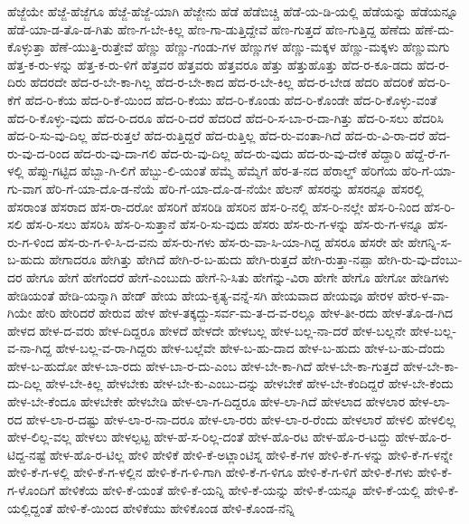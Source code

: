{ಹೆಜ್ಜೆಯೇ
ಹೆಜ್ಜೆ-ಹೆಜ್ಜೆಗೂ
ಹೆಜ್ಜೆ-ಹೆಜ್ಜೆ-ಯಾಗಿ
ಹೆಜ್ಜೇನು
ಹೆಡೆ
ಹೆಡೆಬಿಚ್ಚಿ
ಹೆಡೆ-ಯ-ಡಿ-ಯಲ್ಲಿ
ಹೆಡೆಯನ್ನು
ಹೆಡೆಯನ್ನೂ
ಹೆಡೆ-ಯಾ-ಡ-ತೊ-ಡ-ಗಿತು
ಹೆಣ-ಗ-ಬೇ-ಕಿಲ್ಲ
ಹೆಣ-ಗಾ-ಡುತ್ತಿದ್ದೇವೆ
ಹೆಣ-ಗುತ್ತದೆ
ಹೆಣ-ಗುತ್ತಿದ್ದ
ಹೆಣೆದು
ಹೆಣೆ-ದು-ಕೊಳ್ಳುತ್ತಾ
ಹೆಣೆ-ಯುತ್ತಿ-ರುತ್ತೇವೆ
ಹೆಣ್ಣು
ಹೆಣ್ಣು-ಗಂಡು-ಗಳ
ಹೆಣ್ಣುಗಳ
ಹೆಣ್ಣು-ಮಕ್ಕಳ
ಹೆಣ್ಣು-ಮಕ್ಕಳು
ಹೆಣ್ಣುಮಗು
ಹೆತ್ತ-ಕ-ರು-ಳನ್ನು
ಹೆತ್ತ-ಕ-ರು-ಳಿಗೆ
ಹೆತ್ತವರ
ಹೆತ್ತವರು
ಹೆತ್ತವರೂ
ಹೆತ್ತು
ಹೆತ್ತುಹೊತ್ತು
ಹೆದ-ರ-ಕೂ-ಡದು
ಹೆದ-ರ-ದಿರು
ಹೆದರದೇ
ಹೆದ-ರ-ಬೇ-ಕಾ-ಗಿಲ್ಲ
ಹೆದ-ರ-ಬೇ-ಕಾದ
ಹೆದ-ರ-ಬೇ-ಕಿಲ್ಲ
ಹೆದ-ರ-ಬೇಡ
ಹೆದರಿ
ಹೆದರಿಕೆ
ಹೆದ-ರಿ-ಕೆಗೆ
ಹೆದ-ರಿ-ಕೆಯ
ಹೆದ-ರಿ-ಕೆ-ಯಿಂದ
ಹೆದ-ರಿ-ಕೆಯು
ಹೆದ-ರಿ-ಕೊಂಡು
ಹೆದ-ರಿ-ಕೊಂಡೇ
ಹೆದ-ರಿ-ಕೊಳ್ಳು-ವಂತೆ
ಹೆದ-ರಿ-ಕೊಳ್ಳು-ವುದು
ಹೆದ-ರಿ-ದರೂ
ಹೆದ-ರಿ-ದರೆ
ಹೆದರಿದೆ
ಹೆದ-ರಿ-ಸ-ಬಾ-ರ-ದಾ-ಗಿತ್ತು
ಹೆದ-ರಿ-ಸಲು
ಹೆದರಿಸಿ
ಹೆದ-ರಿ-ಸು-ವು-ದಿಲ್ಲ
ಹೆದ-ರುತ್ತಲೆ
ಹೆದ-ರುತ್ತಿದ್ದರೆ
ಹೆದ-ರುತ್ತಿಲ್ಲ
ಹೆದ-ರು-ವಂತಾ-ಗಿದೆ
ಹೆದ-ರು-ವಿ-ರಾ-ದರೆ
ಹೆದ-ರು-ವು-ದ-ರಿಂದ
ಹೆದ-ರು-ವು-ದಾ-ಗಲಿ
ಹೆದ-ರು-ವು-ದಿಲ್ಲ
ಹೆದ-ರು-ವುದು
ಹೆದ-ರು-ವು-ದೇಕೆ
ಹೆದ್ದಾರಿ
ಹೆದ್ದೆ-ರೆ-ಗ-ಳಲ್ಲಿ
ಹೆಪ್ಪು-ಗಟ್ಟಿದ
ಹೆಬ್ಬಾ-ಗಿ-ಲಿಗೆ
ಹೆಬ್ಬು-ಲಿ-ಯಂತೆ
ಹೆಮ್ಮೆ
ಹೆಮ್ಮೆಗೆ
ಹೆರ-ತ-ನದ
ಹೆರಾಲ್ಡ್
ಹೆರಿಗೆಯ
ಹೆರಿ-ಗೆ-ಯಾ-ಗು-ವಾಗ
ಹೆರಿ-ಗೆ-ಯಾ-ದೊ-ಡ-ನೆಯೆ
ಹೆರಿ-ಗೆ-ಯಾ-ದೊ-ಡ-ನೆಯೇ
ಹೆಲನ್
ಹೆಸರನ್ನು
ಹೆಸರನ್ನೂ
ಹೆಸರಲ್ಲಿ
ಹೆಸರಾಂತ
ಹೆಸರಾದ
ಹೆಸ-ರಾ-ದರೋ
ಹೆಸರಿಗೆ
ಹೆಸರಿಡಿ
ಹೆಸರಿನ
ಹೆಸ-ರಿ-ನಲ್ಲಿ
ಹೆಸ-ರಿ-ನಲ್ಲೇ
ಹೆಸ-ರಿ-ನಿಂದ
ಹೆಸ-ರಿ-ಸಲಿ
ಹೆಸ-ರಿ-ಸಲು
ಹೆಸರಿಸಿ
ಹೆಸ-ರಿ-ಸುತ್ತಾನೆ
ಹೆಸ-ರಿ-ಸು-ವುದು
ಹೆಸರು
ಹೆಸ-ರು-ಗ-ಳನ್ನು
ಹೆಸ-ರು-ಗ-ಳನ್ನೂ
ಹೆಸ-ರು-ಗ-ಳಿಂದ
ಹೆಸ-ರು-ಗ-ಳಿ-ಸಿ-ದ-ವನು
ಹೆಸ-ರು-ಗಳು
ಹೆಸ-ರು-ವಾ-ಸಿ-ಯಾ-ಗಿದ್ದ
ಹೆಸರೂ
ಹೆಸರೇ
ಹೇ
ಹೇಗನ್ನಿ-ಸ-ಬ-ಹುದು
ಹೇಗಾದರೂ
ಹೇಗಿತ್ತು
ಹೇಗಿದೆ
ಹೇಗಿ-ರ-ಬ-ಹುದು
ಹೇಗಿ-ರುತ್ತದೆ
ಹೇಗಿ-ರುತ್ತಾ-ನಪ್ಪಾ
ಹೇಗಿ-ರು-ವು-ದೆಂಬು-ದರ
ಹೇಗೂ
ಹೇಗೆ
ಹೇಗೆಂದರೆ
ಹೇಗೆ-ಎಂಬುದು
ಹೇಗೆ-ನಿ-ಸಿತು
ಹೇಗೆನ್ನು-ವಿರಾ
ಹೇಗೇ
ಹೇಗೊ
ಹೇಗೋ
ಹೇಡಿಗಳು
ಹೇಡಿಯಂತೆ
ಹೇಡಿ-ಯನ್ನಾಗಿ
ಹೇಡ್
ಹೇಯ
ಹೇಯ-ಕೃತ್ಯ-ವನ್ನೆ-ಸಗಿ
ಹೇಯವಾದ
ಹೇಯವೂ
ಹೇರಳ
ಹೇರ-ಳ-ವಾ-ಗಿಯೇ
ಹೇರಿ
ಹೇರಿದರೆ
ಹೇರುವ
ಹೇಳ
ಹೇಳ-ತಕ್ಕದ್ದು-ಸರ್ವ-ಮ-ತ-ದ-ವ-ರಲ್ಲೂ
ಹೇಳ-ತೀ-ರದು
ಹೇಳ-ತೊ-ಡ-ಗಿದ
ಹೇಳದ
ಹೇಳ-ದ-ವರು
ಹೇಳ-ದಿದ್ದರೂ
ಹೇಳದೆ
ಹೇಳದೇ
ಹೇಳಬಲ್ಲ
ಹೇಳ-ಬಲ್ಲ-ನಾ-ದರೆ
ಹೇಳ-ಬಲ್ಲನೇ
ಹೇಳ-ಬಲ್ಲ-ವ-ನಾ-ಗಿದ್ದ
ಹೇಳ-ಬಲ್ಲ-ವ-ರಾ-ಗಿದ್ದರು
ಹೇಳ-ಬಲ್ಲೆವೇ
ಹೇಳ-ಬ-ಹು-ದಾದ
ಹೇಳ-ಬ-ಹುದು
ಹೇಳ-ಬ-ಹು-ದೆಂದು
ಹೇಳ-ಬ-ಹುದೋ
ಹೇಳ-ಬಾ-ರದು
ಹೇಳ-ಬಾ-ರ-ದು-ಎಂಬ
ಹೇಳ-ಬೇ-ಕಾ-ಗಿದೆ
ಹೇಳ-ಬೇ-ಕಾ-ಗುತ್ತದೆ
ಹೇಳ-ಬೇ-ಕಾ-ದು-ದಿಲ್ಲ
ಹೇಳ-ಬೇ-ಕಿಲ್ಲ
ಹೇಳಬೇಕು
ಹೇಳ-ಬೇ-ಕು-ಎಂಬು-ದನ್ನು
ಹೇಳಬೇಕೆ
ಹೇಳ-ಬೇ-ಕೆಂದಿದ್ದರೆ
ಹೇಳ-ಬೇ-ಕೆಂದು
ಹೇಳ-ಬೇ-ಕೆಂದೂ
ಹೇಳಬೇಕೇ
ಹೇಳಬೇಡಿ
ಹೇಳ-ಲಾ-ಗ-ದಿದ್ದರೂ
ಹೇಳ-ಲಾ-ಗಿದೆ
ಹೇಳಲಾದ
ಹೇಳಲಾರ
ಹೇಳ-ಲಾ-ರದ
ಹೇಳ-ಲಾ-ರ-ದಷ್ಟು
ಹೇಳ-ಲಾ-ರ-ನಾ-ದರೂ
ಹೇಳ-ಲಾ-ರರು
ಹೇಳ-ಲಾ-ರ-ರೆಂದು
ಹೇಳಲಾರೆ
ಹೇಳಲಿ
ಹೇಳಲಿಲ್ಲ
ಹೇಳ-ಲಿಲ್ಲ-ವಲ್ಲ
ಹೇಳಲು
ಹೇಳಲ್ಪಟ್ಟ
ಹೇಳ-ಹೆ-ಸ-ರಿಲ್ಲ-ದಂತೆ
ಹೇಳ-ಹೊ-ರಟ
ಹೇಳ-ಹೊ-ರ-ಟದ್ದು
ಹೇಳ-ಹೊ-ರ-ಟಿದ್ದ-ನಷ್ಟೆ
ಹೇಳ-ಹೊ-ರ-ಟಿಲ್ಲ
ಹೇಳಿ
ಹೇಳಿಕೆ
ಹೇಳಿ-ಕೆ-ಅಟ್ಲಾಂಟಿಸ್ನ
ಹೇಳಿ-ಕೆ-ಗಳ
ಹೇಳಿ-ಕೆ-ಗ-ಳನ್ನು
ಹೇಳಿ-ಕೆ-ಗ-ಳನ್ನೇ
ಹೇಳಿ-ಕೆ-ಗ-ಳಲ್ಲಿ
ಹೇಳಿ-ಕೆ-ಗ-ಳಲ್ಲಿನ
ಹೇಳಿ-ಕೆ-ಗ-ಳಿ-ಗಾಗಿ
ಹೇಳಿ-ಕೆ-ಗ-ಳಿಗೂ
ಹೇಳಿ-ಕೆ-ಗ-ಳಿಗೆ
ಹೇಳಿ-ಕೆ-ಗಳು
ಹೇಳಿ-ಕೆ-ಗ-ಳೊಂದಿಗೆ
ಹೇಳಿಕೆಯ
ಹೇಳಿ-ಕೆ-ಯಂತೆ
ಹೇಳಿ-ಕೆ-ಯನ್ನಿ
ಹೇಳಿ-ಕೆ-ಯನ್ನು
ಹೇಳಿ-ಕೆ-ಯನ್ನೂ
ಹೇಳಿ-ಕೆ-ಯಲ್ಲಿ
ಹೇಳಿ-ಕೆ-ಯಲ್ಲಿದ್ದಂತೆ
ಹೇಳಿ-ಕೆ-ಯಿಂದ
ಹೇಳಿಕೆಯು
ಹೇಳಿಕೊಂಡ
ಹೇಳಿ-ಕೊಂಡ-ನೆನ್ನಿ
}
